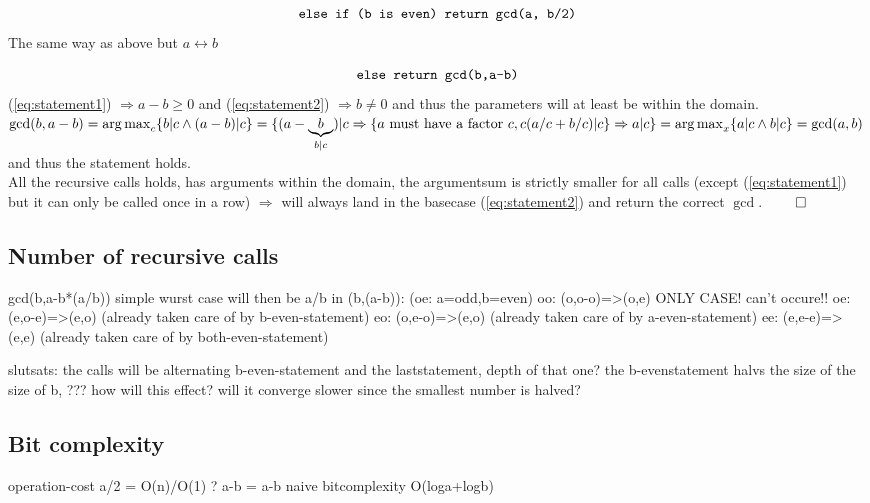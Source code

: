 \documentclass[a4paper,twoside=false,abstract=false,numbers=noenddot,
titlepage=false,headings=small,parskip=half,version=last]{scrartcl}
\DeclareMathOperator*{\argmax}{arg\,max}
\begin{document}
\begin{equation} \label{eq:statement5}
    \verb+else if (b is even) return gcd(a, b/2)+
\end{equation}
The same way as above but $a \leftrightarrow b$

\begin{equation*} \label{eq:statement6}
    \verb+else return gcd(b,a-b)+
\end{equation*}
(\ref{eq:statement1}) $\Rightarrow a-b \ge 0$ and (\ref{eq:statement2}) $\Rightarrow b \neq 0$ and thus the parameters will at least be within the domain. \\

$
    \gcd(b,a-b)=\argmax_c \{b|c \wedge (a-b)|c\}=\\
    \{ (a-\underbrace{b}_{b|c})|c \Rightarrow
    \{ \text{$a$ must have a factor $c$}, c(a/c+b/c)|c \} \Rightarrow
    a|c \}\\
    =\argmax_x\{a|c \wedge b|c\}=\gcd(a,b)
$
and thus the statement holds. \\

All the recursive calls holds, has arguments within the domain, the argumentsum is strictly smaller for all calls (except (\ref{eq:statement1}) but it can only be called once in a row) $\Rightarrow$ will always land in the basecase (\ref{eq:statement2}) and return the correct $\gcd$. $\qed$

\subsection{Number of recursive calls}

gcd(b,a-b*(a/b)) simple wurst case will then be a/b
in (b,(a-b)): (oe: a=odd,b=even)
    oo: (o,o-o)=>(o,e) ONLY CASE!
    { can't occure!! 
       oe: (e,o-e)=>(e,o) (already taken care of by b-even-statement)
       eo: (o,e-o)=>(e,o) (already taken care of by a-even-statement)
       ee: (e,e-e)=>(e,e) (already taken care of by both-even-statement)
    }

slutsats: the calls will be alternating b-even-statement and the laststatement, depth of that one? the b-evenstatement halvs the size of the size of b, ??? how will this effect? will it converge slower since the smallest number is halved?


\subsection{Bit complexity}

operation-cost
a/2 = O(n)/O(1) ?
a-b = a-b naive bitcomplexity O(loga+logb)
\end{document}
